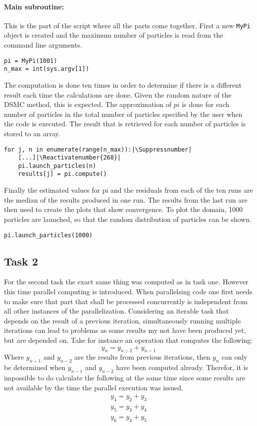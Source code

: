 \documentclass{aa}
\begin{document}
\paragraph{Main subroutine:}
This is the part of the script where all the parts come together. First a new \verb+MyPi+
object is created and the maximum number of particles is read from the command line arguments.
\begin{lstlisting}[firstnumber=236]
pi = MyPi(1001)
n_max = int(sys.argv[1])
\end{lstlisting}
The computation is done ten times in order to determine if there is a different result each
time the calculations are done. Given the random nature of the DSMC method, this is expected.
The approximation of \(pi\) is done for each number of particles in the total number of
particles specified by the user when the code is executed. The result that is retrieved for
each number of particles is stored to an array.
\begin{lstlisting}[firstnumber=257]
for j, n in enumerate(range(n_max)):|\Suppressnumber|
    [...]|\Reactivatenumber{268}|
    pi.launch_particles(n)
    results[j] = pi.compute()
\end{lstlisting}
Finally the estimated values for pi and the residuals from each of the ten runs are the median
of the results produced in one run. The results from the last run are then used to create the
plots that show convergence. To plot the domain, 1000 particles are launched, so that the
random distribution of particles can be shown.
\begin{lstlisting}[firstnumber=295]
pi.launch_particles(1000)
\end{lstlisting}

\subsection{Task 2}%
\label{sub:task_2}

For the second task the exact same thing was computed as in task one. However this time
parallel computing is introduced. When parallelsing code one first needs to make sure that part
that shall be processed concurrently is independent from all other instances of the
parallelization. Considering an iterable task that depends on the result of a previous
iteration, simultaneously running multiple iterations can lead to problems as some results my
not have been produced yet, but are depended on. Take for instance an operation that computes
the following:
\begin{equation}
    \label{eqn:previous_dependence}
    y_{n} = y_{n-2} + y_{n-1}
\end{equation}
Where \(y_{n-1}\) and \(y_{n-2}\) are the results from previous iterations, then \(y_n\) can
only be determined when \(y_{n-1}\) and \(y_{n-2}\) have been computed already. Therefor, it is
impossible to do calculate the following at the same time since some results are not available
by the time the parallel execution was issued.
\begin{eqnarray}
    y_4 = y_2 + y_3\\
    y_5 = y_3 + y_4\\
    y_6 = y_4 + y_5
\end{eqnarray}
\end{document}
